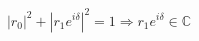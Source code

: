 \documentclass[preview]{standalone}
\begin{document}
\begin{align*}
|r_0|^2 + |r_1 e^{i\delta}|^2 = 1 \Rightarrow r_1 e^{i\delta} \in \mathbb{C}
\end{align*}
\end{document}
